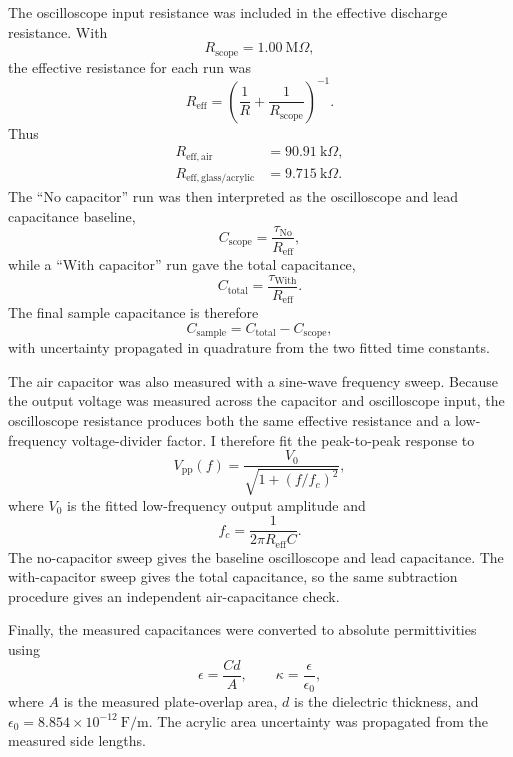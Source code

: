 \documentclass[letterpaper,12pt]{article}
\begin{document}
The oscilloscope input resistance was included in the effective discharge resistance. With
\begin{equation}
    R_{\mathrm{scope}} = 1.00~\mathrm{M}\Omega,
\end{equation}
the effective resistance for each run was
\begin{equation}
    R_{\mathrm{eff}} = \left(\frac{1}{R}+\frac{1}{R_{\mathrm{scope}}}\right)^{-1}.
\end{equation}
Thus
\begin{align}
    R_{\mathrm{eff,air}} &= 90.91~\mathrm{k}\Omega,\\
    R_{\mathrm{eff,glass/acrylic}} &= 9.715~\mathrm{k}\Omega.
\end{align}
The ``No capacitor'' run was then interpreted as the oscilloscope and lead capacitance baseline,
\begin{equation}
    C_{\mathrm{scope}} = \frac{\tau_{\mathrm{No}}}{R_{\mathrm{eff}}},
\end{equation}
while a ``With capacitor'' run gave the total capacitance,
\begin{equation}
    C_{\mathrm{total}} = \frac{\tau_{\mathrm{With}}}{R_{\mathrm{eff}}}.
\end{equation}
The final sample capacitance is therefore
\begin{equation}
    C_{\mathrm{sample}} = C_{\mathrm{total}} - C_{\mathrm{scope}},
\end{equation}
with uncertainty propagated in quadrature from the two fitted time constants.

The air capacitor was also measured with a sine-wave frequency sweep. Because the output voltage was measured across the capacitor and oscilloscope input, the oscilloscope resistance produces both the same effective resistance and a low-frequency voltage-divider factor. I therefore fit the peak-to-peak response to
\begin{equation}
    V_{\mathrm{pp}}(f) =
    \frac{V_0}{\sqrt{1+\left(f/f_c\right)^2}},
\end{equation}
where $V_0$ is the fitted low-frequency output amplitude and
\begin{equation}
    f_c = \frac{1}{2\pi R_{\mathrm{eff}} C}.
\end{equation}
The no-capacitor sweep gives the baseline oscilloscope and lead capacitance. The with-capacitor sweep gives the total capacitance, so the same subtraction procedure gives an independent air-capacitance check.

Finally, the measured capacitances were converted to absolute permittivities using
\begin{equation}
    \epsilon = \frac{Cd}{A},
    \qquad
    \kappa = \frac{\epsilon}{\epsilon_0},
\end{equation}
where $A$ is the measured plate-overlap area, $d$ is the dielectric thickness, and $\epsilon_0=8.854\times10^{-12}~\mathrm{F/m}$. The acrylic area uncertainty was propagated from the measured side lengths.
\end{document}
